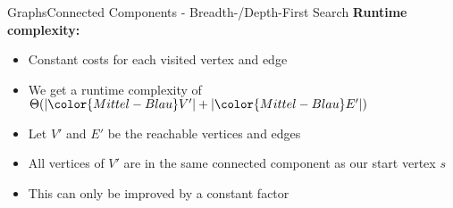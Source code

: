 \begin{frame}{Graphs}{Connected Components - Breadth-/Depth-First Search}
  \textbf{Runtime complexity:}
  \begin{itemize}
    \item<2->
      Constant costs for each visited vertex and edge
    \item<3->
      We get a runtime complexity of
      \begin{math}
        \Theta(\vert {\color{Mittel-Blau}V'} \vert
          + \vert {\color{Mittel-Blau}E'} \vert)
      \end{math}
    \item<4->
      Let {\color{Mittel-Blau}$V'$} and {\color{Mittel-Blau}$E'$} be the
      reachable vertices and edges
    \item<5->
      All vertices of {\color{Mittel-Blau}$V'$} are in the same connected
      component as our start vertex {\color{Mittel-Blau}$s$}
    \item<6->
      This can only be improved by a constant factor
  \end{itemize}
\end{frame}
